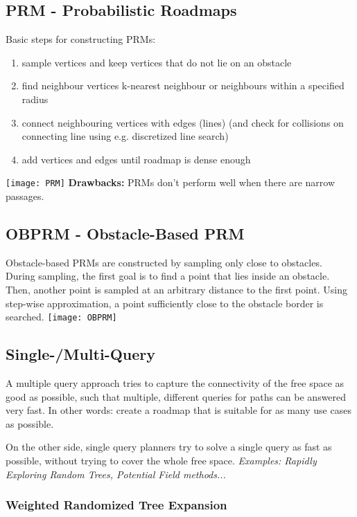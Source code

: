 \begin{multicols*}{2}
\subsection{PRM - Probabilistic Roadmaps}
Basic steps for constructing PRMs:
\begin{enumerate}
	\item sample vertices and keep vertices that do not lie on an obstacle
	\item find neighbour vertices
		\subitem k-nearest neighbour or
		\subitem neighbours within a specified radius
	\item connect neighbouring vertices with edges (lines) (and check for collisions on connecting line using e.g. discretized line search)
	\item add vertices and edges until roadmap is dense
enough
\end{enumerate}
\texttt{[image: PRM]}
\textbf{Drawbacks: } PRMs don't perform well when there are narrow passages.

\subsection{OBPRM - Obstacle-Based PRM}
Obstacle-based PRMs are constructed by sampling only close to obstacles. During sampling, the first goal is to find a point that lies inside an obstacle. Then, another point is sampled at an arbitrary distance to the first point. Using step-wise approximation, a point sufficiently close to the obstacle border is searched.
\texttt{[image: OBPRM]}

\subsection{Single-/Multi-Query}
A multiple query approach tries to capture the connectivity of the free space as good as possible, such that multiple, different queries for paths can be answered very fast. In other words: create a roadmap that is suitable for as many use cases as possible. 

On the other side, single query planners try to solve a single query as fast as possible, without trying to cover the whole free space. \textit{Examples: Rapidly Exploring Random Trees, Potential Field methods...}

\subsubsection{Weighted Randomized Tree Expansion}


\end{multicols*}
